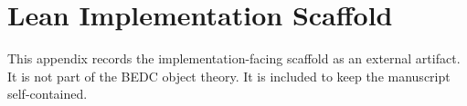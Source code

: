 
\chapter{Lean Implementation Scaffold}
\label{app:lean-scaffold}
This appendix records the implementation-facing scaffold as an external artifact. It is not part of the BEDC object theory. It is included to keep the manuscript self-contained.


